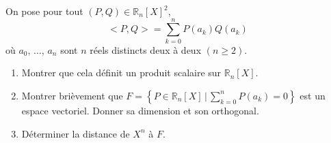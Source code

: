 \documentclass[a4paper,twoside,french,11pt]{VcCours}
\begin{document}
\begin{Exercice}{} On pose pour tout $(P,Q) \in \mathbb{R}_n[X]^2$,
$$ <P,Q> = \sum_{k=0}^n P(a_k) Q(a_k)$$
où $a_0$, $\ldots$, $a_n$ sont $n$ réels distincts deux à deux $(n \geq 2)$.
\begin{enumerate}
\item Montrer que cela définit un produit scalaire sur $\mathbb{R}_n[X]$.
\item Montrer brièvement que $F= \left\lbrace P \in \mathbb{R}_n[X] \, \vert \, \sum_{k=0}^n P(a_k)=0 \right\rbrace$ est un espace vectoriel. Donner sa dimension et son orthogonal.
\item Déterminer la distance de $X^n$ à $F$.
\end{enumerate}
\end{Exercice}

%
%
%
\end{document}
